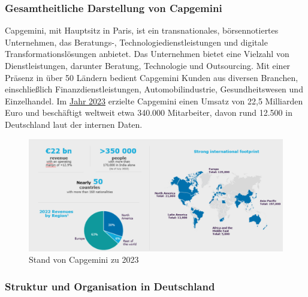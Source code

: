 \documentclass[a4paper, 12pt]{scrartcl}
\begin{document}
	\subsubsection{Gesamtheitliche Darstellung von Capgemini} %
Capgemini, mit Hauptsitz in Paris, ist ein transnationales, börsennotiertes Unternehmen, das Beratungs-, Technologiedienstleistungen und digitale Transformationslösungen anbietet. Das Unternehmen bietet eine Vielzahl von Dienstleistungen, darunter Beratung, Technologie und Outsourcing. Mit einer Präsenz in über 50 Ländern bedient Capgemini Kunden aus diversen Branchen, einschließlich Finanzdienstleistungen, Automobilindustrie, Gesundheitswesen und Einzelhandel. Im \href{https://www.capgemini.com/de-de/news/pressemitteilung/capgemini-delivers-another-record-performance-in-2023/}{Jahr 2023} erzielte Capgemini einen Umsatz von 22,5 Milliarden Euro und beschäftigt weltweit etwa 340.000 Mitarbeiter, davon rund 12.500 in Deutschland laut der internen Daten.
	\begin{figure}[h!]
		\begin{center}
			\includegraphics[width=12cm]{CApgemini zahlen.png}
			\caption{Stand von Capgemini zu 2023}
			\label{Stand von Capgemini}
		\end{center}
	\end{figure}
	\subsubsection{Struktur und Organisation in Deutschland}
\end{document}
